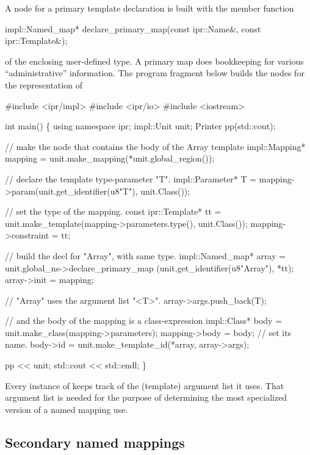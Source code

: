 \documentclass[11pt]{article}
\begin{document}
A node for a primary template declaration is built with the member function  
\begin{Program}
  impl::Named_map* declare_primary_map(const ipr::Name&, const ipr::Template&);
\end{Program}
of the enclosing user-defined type.  A primary map does bookkeeping for
various ``administrative'' information.  The program fragment below builds the
nodes for the representation of 
\begin{Program}
#include <ipr/impl>
#include <ipr/io>
#include <iostream>

int main()
\{
   using namespace ipr;
   impl::Unit unit;
   Printer pp(std::cout);

   // make the node that contains the body of the Array template
   impl::Mapping* mapping = unit.make_mapping(*unit.global_region());

   // declare the template type-parameter "T".
   impl::Parameter* T = mapping->param(unit.get_identifier(u8"T"),
                                       unit.Class());

   // set the type of the mapping.
   const ipr::Template* tt = unit.make_template(mapping->parameters.type(),
                                                unit.Class());
   mapping->constraint = tt;

   // build the decl for "Array", with same type.
   impl::Named_map* array = unit.global_ns->declare_primary_map
      (unit.get_identifier(u8"Array"), *tt);
   array->init = mapping;

   // "Array" uses the argument list "<T>".
   array->args.push_back(T);

   // and the body of the mapping is a class-expression
   impl::Class* body = unit.make_class(mapping->parameters);
   mapping->body = body;
   // set its name.
   body->id = unit.make_template_id(*array, array->args);

   pp << unit;
   std::cout << std::endl;
\}
\end{Program}

Every instance of  keeps track of the (template) argument
list it uses.  That argument list is needed for the purpose of determining
the most specialized version of a named mapping use.

\subsection{Secondary named mappings}
\label{sec:named-mapping:secondary}
\end{document}
